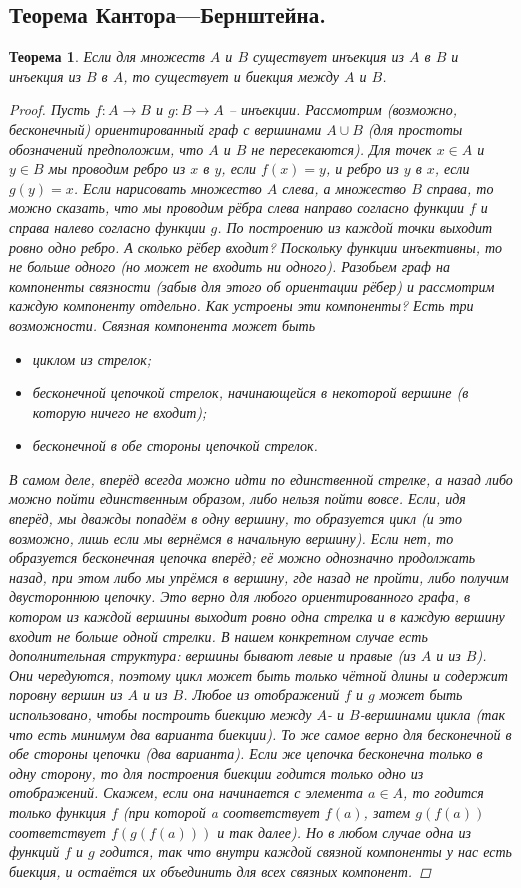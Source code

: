 \documentclass{article}
\newtheorem{theorem}{Теорема}
\begin{document}
\subsection{Теорема Кантора—Бернштейна.}
\begin{theorem}
Если для множеств $A$ и $B$ существует инъекция из $A$ в $B$ и инъекция из $B$ в $A$, то существует и биекция между $A$ и $B$.
\begin{proof}
Пусть $f : A \to B$ и $g : B \to A$ – инъекции. Рассмотрим (возможно, бесконечный) ориентированный граф с вершинами $A \cup B$ (для простоты обозначений предположим, что $A$ и $B$ не пересекаются). Для точек $x \in A$ и $y \in B$ мы проводим ребро из $x$ в $y$, если $f(x) = y$, и ребро из $y$ в $x$, если $g(y) = x$. Если нарисовать множество $A$ слева, а множество $B$ справа, то можно сказать, что мы проводим рёбра слева направо согласно функции $f$ и справа налево согласно функции $g$.
\newline
По построению из каждой точки выходит ровно одно ребро. А сколько рёбер входит? Поскольку функции инъективны, то не больше одного (но может не входить ни одного).
\newline
Разобьем граф на компоненты связности (забыв для этого об ориентации рёбер) и рассмотрим каждую компоненту отдельно. Как устроены эти компоненты? Есть три возможности. Связная компонента может быть
\begin{itemize}
    \item циклом из стрелок;
    \item бесконечной цепочкой стрелок, начинающейся в некоторой вершине (в которую ничего не входит);
    \item бесконечной в обе стороны цепочкой стрелок.
\end{itemize}
В самом деле, вперёд всегда можно идти по единственной стрелке, а назад либо можно пойти единственным образом, либо нельзя пойти вовсе. Если, идя вперёд, мы дважды попадём в одну вершину, то образуется цикл (и это возможно, лишь если мы вернёмся в начальную вершину). Если нет, то образуется бесконечная цепочка вперёд; её можно однозначно продолжать назад, при этом либо мы упрёмся в вершину, где назад не пройти, либо получим двустороннюю цепочку.
\newline
Это верно для любого ориентированного графа, в котором из каждой вершины выходит ровно одна стрелка и в каждую вершину входит не больше одной стрелки. В нашем конкретном случае есть дополнительная структура: вершины бывают левые и правые (из $A$ и из $B$). Они чередуются, поэтому цикл может быть только чётной длины и содержит поровну вершин из $A$ и из $B$. Любое из отображений $f$ и $g$ может быть использовано, чтобы построить биекцию между $A$- и $B$-вершинами цикла (так что есть минимум два варианта биекции). То же самое верно для бесконечной в обе стороны цепочки (два варианта). Если же цепочка бесконечна только в одну сторону, то для построения биекции годится только одно из отображений. Скажем, если она начинается с элемента $a \in A$, то годится только функция $f$ (при которой a соответствует $f(a)$, затем $g(f(a))$ соответствует $f(g(f(a)))$ и так далее). Но в любом случае одна из функций $f$ и $g$ годится, так что внутри каждой связной компоненты у нас есть биекция, и остаётся их объединить для всех связных компонент.

\end{proof}
\end{theorem}
\end{document}
